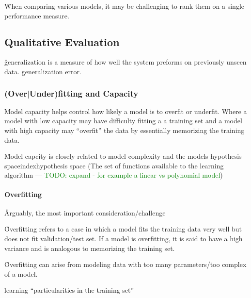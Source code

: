 \r{When comparing various models, it may be challenging to rank them on a single performance measure. }

\subsection{Qualitative Evaluation}

\r{generalization is a measure of how well the system preforms on previously unseen data. generalization error.}



\subsubsection{(Over$|$Under)fitting and Capacity}

\r{{Model capacity} helps control how likely a model is to overfit or underfit. Where a model with low capacity may have difficulty fitting a a training set and a model with high capacity may ``overfit'' the data by essentially memorizing the training data.}

\r{Model capcity is closely related to model complexity and the models {hypothesis space}index{hypothesis space} (The set of functions available to the learning algorithm --- \textcolor{green}{TODO: expand - for example a linear vs polynomial model})}


\paragraph{Overfitting}

\r{Arguably, the most important consideration/challenge}

\r{Overfitting refers to a case in which a model fits the training data very well but does not fit validation/test set. If a model is overfitting, it is said to have a high variance and is analogous to memorizing the training set.}

\r{Overfitting can arise from modeling data with too many parameters/too complex of a model.}

\r{learning ``particularities in the training set''}



